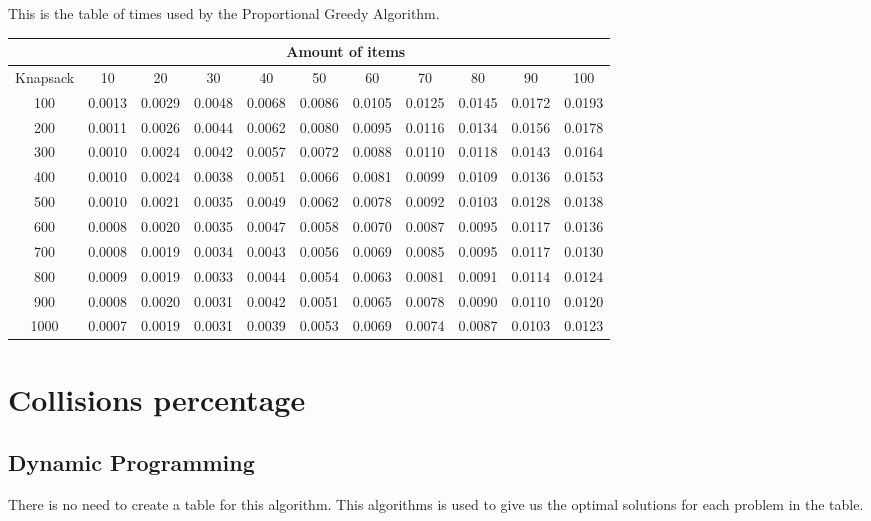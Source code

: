 \documentclass{report}
\begin{document}
This is the table of times used by the Proportional Greedy Algorithm. 
\begin{table}[H]
\hspace{-3cm}
\begin{tabular}{|c|c|c|c|c|c|c|c|c|c|c|}
\hline
& \multicolumn{10}{c|}{Amount of items} \\
\hline
Knapsack & 10 & 20 & 30 & 40 & 50 & 60 & 70 & 80 & 90 & 100 \\
\hline
100 & 0.0013 & 0.0029 & 0.0048 & 0.0068 & 0.0086 & 0.0105 & 0.0125 & 0.0145 & 0.0172 & 0.0193\\ 
\hline
200 & 0.0011 & 0.0026 & 0.0044 & 0.0062 & 0.0080 & 0.0095 & 0.0116 & 0.0134 & 0.0156 & 0.0178\\ 
\hline
300 & 0.0010 & 0.0024 & 0.0042 & 0.0057 & 0.0072 & 0.0088 & 0.0110 & 0.0118 & 0.0143 & 0.0164\\ 
\hline
400 & 0.0010 & 0.0024 & 0.0038 & 0.0051 & 0.0066 & 0.0081 & 0.0099 & 0.0109 & 0.0136 & 0.0153\\ 
\hline
500 & 0.0010 & 0.0021 & 0.0035 & 0.0049 & 0.0062 & 0.0078 & 0.0092 & 0.0103 & 0.0128 & 0.0138\\ 
\hline
600 & 0.0008 & 0.0020 & 0.0035 & 0.0047 & 0.0058 & 0.0070 & 0.0087 & 0.0095 & 0.0117 & 0.0136\\ 
\hline
700 & 0.0008 & 0.0019 & 0.0034 & 0.0043 & 0.0056 & 0.0069 & 0.0085 & 0.0095 & 0.0117 & 0.0130\\ 
\hline
800 & 0.0009 & 0.0019 & 0.0033 & 0.0044 & 0.0054 & 0.0063 & 0.0081 & 0.0091 & 0.0114 & 0.0124\\ 
\hline
900 & 0.0008 & 0.0020 & 0.0031 & 0.0042 & 0.0051 & 0.0065 & 0.0078 & 0.0090 & 0.0110 & 0.0120\\ 
\hline
1000 & 0.0007 & 0.0019 & 0.0031 & 0.0039 & 0.0053 & 0.0069 & 0.0074 & 0.0087 & 0.0103 & 0.0123\\ 
\hline
\end{tabular}
\end{table}



\section*{Collisions percentage}

\subsection*{Dynamic Programming}

There is no need to create a table for this algorithm. This algorithms is used to give us the optimal solutions for each problem in the table.
\end{document}
